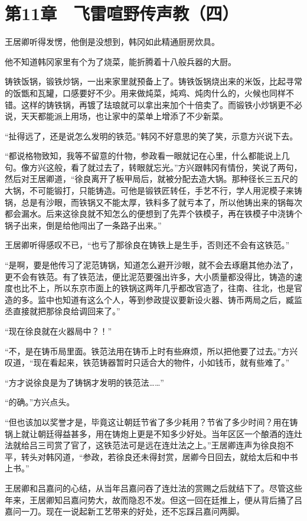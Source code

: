 \section{第11章　飞雷喧野传声教（四）}

王居卿听得发愣，他倒是没想到，韩冈如此精通厨房炊具。

他不知道韩冈家里有个为了烧菜，能折腾着十八般兵器的大厨。

铸铁饭锅，锻铁炒锅，一出来家里就预备上了。铸铁饭锅烧出来的米饭，比起寻常的饭甑和瓦罐，口感要好不少。用来做炖菜，炖鸡、炖肉什么的，火候也同样不错。这样的铸铁锅，再镀了珐琅就可以拿出来加个十倍卖了。而锻铁小炒锅更不必说，天天都能派上用场，也让家中的菜单上增添了不少新菜。

“扯得远了，还是说怎么发明的铁范。”韩冈不好意思的笑了笑，示意方兴说下去。

“都说格物致知，我等不留意的什物，参政看一眼就记在心里，什么都能说上几句。像方兴这般，看了就过去了，转眼就忘光。”方兴跟韩冈有情份，笑说了两句，然后对王居卿道，“徐良离开了板甲局后，就被分配去造大锅。那种径长三五尺的大锅，不可能锻打，只能铸造。可他是锻铁匠转任，手艺不行，学人用泥模子来铸锅，总是有沙眼，而铁锅又不能太厚，铁料多了就亏本了，所以他铸出来的锅每次都会漏水。后来这徐良就不知怎么的便想到了先弄个铁模子，再在铁模子中浇铸个锅子出来，倒是给他闯出了一条路子出来。”

王居卿听得感叹不已，“也亏了那徐良在铸铁上是生手，否则还不会有这铁范。”

“是啊，要是他传习了泥范铸锅，知道怎么避开沙眼，就不会去琢磨其他办法了，更不会有铁范。有了铁范法，便比泥范要强出许多，大小质量都没得比，铸造的速度也比不上，所以东京市面上的铁锅这两年几乎都改官造了，往南、往北，也是官造的多。监中也知道有这么个人，等到参政提议要新设火器、铸币两局之后，臧监丞直接就把那徐良给调回来了。”

“现在徐良就在火器局中？！”

“不，是在铸币局里面。铁范法用在铸币上时有些麻烦，所以把他要了过去。”方兴叹道，“现在看起来，铁范铸器暂时只适合大的物件，小如钱币，就有些难了。”

“方才说徐良是为了铸锅才发明的铁范法……”

“的确。”方兴点头。

“但也该加以奖誉才是，毕竟这让朝廷节省了多少耗用？节省了多少时间？用在铸锅上就让朝廷得益甚多，用在铸炮上更是不知多少好处。当年区区一个酿酒的连灶法就给吕三司赏了官了，这铁范法可是远在连灶法之上。”王居卿连声为徐良抱不平，转头对韩冈道，“参政，若徐良还未得封赏，居卿今日回去，就给太后和中书上书。”

王居卿和吕嘉问的心结，从当年吕嘉问吞了连灶法的赏赐之后就结下了。尽管这些年来，王居卿知吕嘉问势大，故而隐忍不发。但这一回在廷推上，便从背后捅了吕嘉问一刀。现在一说起新工艺带来的好处，还不忘踩吕嘉问两脚。

